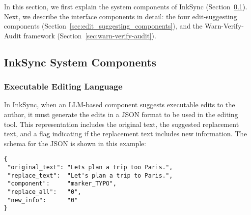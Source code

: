 \documentclass[manuscript]{acmart}
\newenvironment{myjsonblock}[1]{%
    \begin{center}
    \begin{minipage}{0.5\textwidth}
    \begin{mdframed}[
        linecolor=black,
        linewidth=1pt,
        innertopmargin=6pt,
        innerbottommargin=6pt,
        innerrightmargin=10pt,
        innerleftmargin=10pt,
        frametitle=#1,
        frametitlebackgroundcolor=slackbrown, %
        frametitlefont=\color{white}\bfseries, %
    ]
}{%
    \end{mdframed}
    \end{minipage}
    \end{center}
}
\begin{document}
In this section, we first explain the system components of InkSync  (Section~\ref{sec:system_details}). Next, we describe the interface components in detail: the four edit-suggesting components (Section~\ref{sec:edit_suggesting_components}), and the Warn-Verify-Audit framework (Section~\ref{sec:warn-verify-audit}).


\subsection{InkSync System Components}
\label{sec:system_details}
\subsubsection{Executable Editing Language} \label{sec:executable_edit_language}

In InkSync, when an LLM-based component suggests executable edits to the author, it must generate the edits in a JSON format to be used in the editing tool. This representation includes the original text, the suggested replacement text, and a flag indicating if the replacement text includes new information. The schema for the JSON is shown in this example:
\begin{myjsonblock}{Executable Edit Language - Example Edit}
    \begin{verbatim}
{
 "original_text": "Lets plan a trip too Paris.",
 "replace_text":  "Let's plan a trip to Paris.",
 "component":     "marker_TYPO",
 "replace_all":   "0",
 "new_info":      "0"
}
    \end{verbatim}
\end{myjsonblock}
\end{document}
